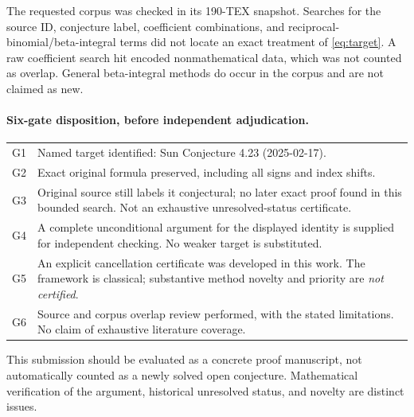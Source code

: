 \documentclass[11pt,a4paper]{article}
\numberwithin{equation}{section}
\begin{document}
The requested corpus \cite{Corpus} was checked in its 190-TEX snapshot. Searches for the source ID, conjecture label, coefficient combinations, and reciprocal-binomial/beta-integral terms did not locate an exact treatment of \eqref{eq:target}. A raw coefficient search hit encoded nonmathematical data, which was not counted as overlap. General beta-integral methods do occur in the corpus and are not claimed as new.

\paragraph{Six-gate disposition, before independent adjudication.}
\begin{center}
\begin{tabular}{p{.08\linewidth}p{.82\linewidth}}
\toprule
G1 & Named target identified: Sun Conjecture 4.23 (2025-02-17).\\
G2 & Exact original formula preserved, including all signs and index shifts.\\
G3 & Original source still labels it conjectural; no later exact proof found in this bounded search. Not an exhaustive unresolved-status certificate.\\
G4 & A complete unconditional argument for the displayed identity is supplied for independent checking. No weaker target is substituted.\\
G5 & An explicit cancellation certificate was developed in this work. The framework is classical; substantive method novelty and priority are \emph{not certified}.\\
G6 & Source and corpus overlap review performed, with the stated limitations. No claim of exhaustive literature coverage.\\
\bottomrule
\end{tabular}
\end{center}
This submission should be evaluated as a concrete proof manuscript, not automatically counted as a newly solved open conjecture. Mathematical verification of the argument, historical unresolved status, and novelty are distinct issues.

\appendix
\end{document}
